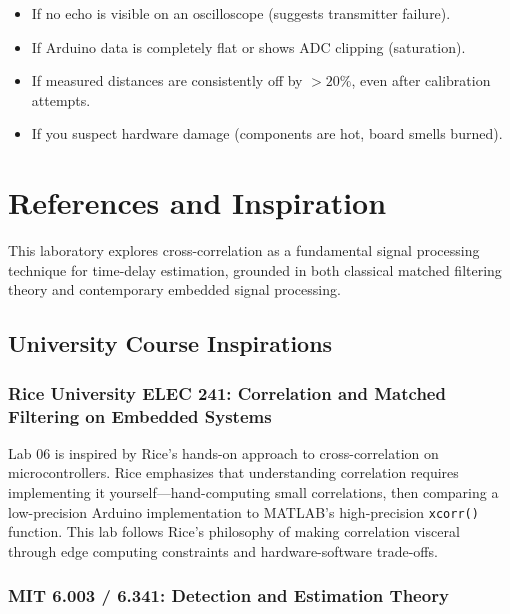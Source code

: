 \documentclass[11pt,letterpaper]{article}
\begin{document}
\begin{itemize}
    \item If no echo is visible on an oscilloscope (suggests transmitter failure).
    \item If Arduino data is completely flat or shows ADC clipping (saturation).
    \item If measured distances are consistently off by $> 20\%$, even after calibration attempts.
    \item If you suspect hardware damage (components are hot, board smells burned).
\end{itemize}

\clearpage

\section*{References and Inspiration}

This laboratory explores cross-correlation as a fundamental signal processing technique for time-delay estimation, grounded in both classical matched filtering theory and contemporary embedded signal processing.

\subsection*{University Course Inspirations}

\subsubsection*{Rice University ELEC 241: Correlation and Matched Filtering on Embedded Systems}

Lab 06 is inspired by Rice's hands-on approach to cross-correlation on microcontrollers. Rice emphasizes that understanding correlation requires implementing it yourself—hand-computing small correlations, then comparing a low-precision Arduino implementation to MATLAB's high-precision \texttt{xcorr()} function. This lab follows Rice's philosophy of making correlation visceral through edge computing constraints and hardware-software trade-offs.

\subsubsection*{MIT 6.003 / 6.341: Detection and Estimation Theory}
\end{document}

